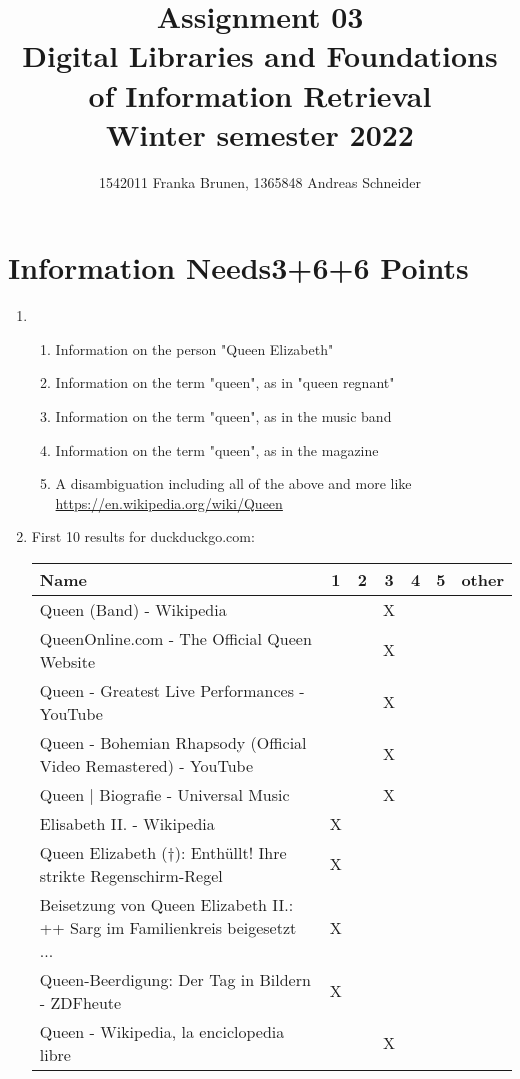 \documentclass[10pt,a4paper]{article}
\title{ \vspace{-3em}
        Assignment 03\\
		\small{\bf Digital Libraries and Foundations of Information Retrieval}\\
		\small{Winter semester 2022}}
\author{\small{1542011 Franka Brunen}, \small{1365848 Andreas Schneider}}
\date{}
\begin{document}
\setlength{\parskip}{6pt} %
\setlength{\parindent}{0pt}

\leftskip=1cm\rightskip=0.5cm %

\maketitle

\section{\hfill Information Needs\hfill 3+6+6 Points}
\begin{enumerate}
    \item \begin{enumerate}
            \item Information on the person "Queen Elizabeth"
            \item Information on the term "queen", as in "queen regnant"
            \item Information on the term "queen", as in the music band
            \item Information on the term "queen", as in the magazine
            \item A disambiguation including all of the above and more like \url{https://en.wikipedia.org/wiki/Queen}
        \end{enumerate}
    \item First 10 results for duckduckgo.com:\\
        \hspace*{-2cm}\begin{tabular}{|p{}||c|c|c|c|c|c|}
            \hline
            \textbf{Name} & \textbf{1} & \textbf{2} & \textbf{3} & \textbf{4} & \textbf{5} & \textbf{other}\\
            \hline
            Queen (Band) - Wikipedia&&&X&&&\\
            QueenOnline.com - The Official Queen Website&&&X&&&\\
            Queen - Greatest Live Performances - YouTube&&&X&&&\\
            Queen - Bohemian Rhapsody (Official Video Remastered) - YouTube&&&X&&&\\
            Queen | Biografie - Universal Music&&&X&&&\\
            Elisabeth II. - Wikipedia&X&&&&&\\
            Queen Elizabeth (†): Enthüllt! Ihre strikte Regenschirm-Regel&X&&&&&\\
            Beisetzung von Queen Elizabeth II.: ++ Sarg im Familienkreis beigesetzt ...&X&&&&&\\
            Queen-Beerdigung: Der Tag in Bildern - ZDFheute&X&&&&&\\
            Queen - Wikipedia, la enciclopedia libre&&&X&&&\\
            \hline
        \end{tabular}
        

\end{enumerate}
\end{document}
